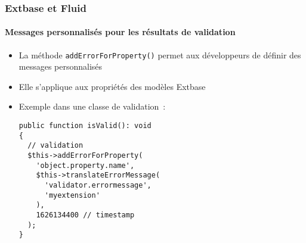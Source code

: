 %

\begin{frame}[fragile]
	\frametitle{Extbase et Fluid}
	\framesubtitle{Messages personnalisés pour les résultats de validation}


	\begin{itemize}
		\item La méthode \texttt{addErrorForProperty()} permet aux développeurs de
		    définir des messages personnalisés
		\item Elle s'applique aux propriétés des modèles Extbase
		\item Exemple dans une classe de validation~:
\begin{lstlisting}
public function isValid(): void
{
  // validation
  $this->addErrorForProperty(
    'object.property.name',
    $this->translateErrorMessage(
      'validator.errormessage',
      'myextension'
    ),
    1626134400 // timestamp
  );
}
\end{lstlisting}

	\end{itemize}

\end{frame}

